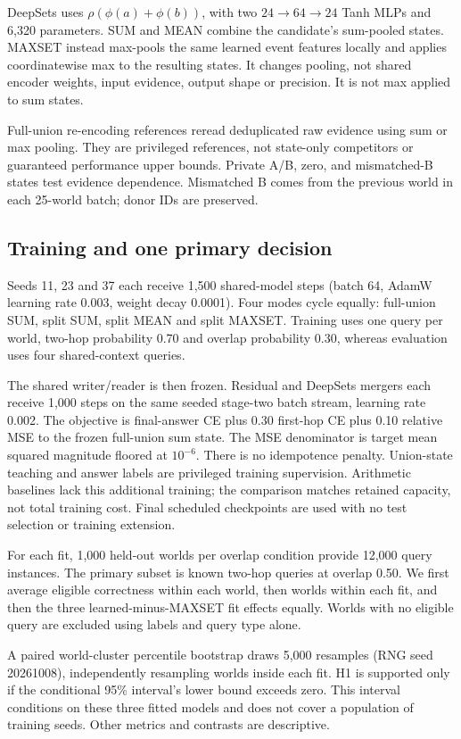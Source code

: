 \documentclass[10pt]{article}
\begin{document}
DeepSets uses $\rho(\phi(a)+\phi(b))$, with two
$24\rightarrow64\rightarrow24$ Tanh MLPs and 6,320 parameters.
SUM and MEAN combine the candidate's sum-pooled states. MAXSET instead
max-pools the same learned event features locally and applies coordinatewise
max to the resulting states. It changes pooling, not shared encoder weights,
input evidence, output shape or precision. It is not max applied to sum states.

Full-union re-encoding references reread deduplicated raw evidence using sum
or max pooling. They are privileged references, not state-only competitors
or guaranteed performance upper bounds. Private A/B, zero, and mismatched-B
states test evidence dependence. Mismatched B comes from the previous world
in each 25-world batch; donor IDs are preserved.

\subsection{Training and one primary decision}
Seeds 11, 23 and 37 each receive 1,500 shared-model steps (batch 64, AdamW
learning rate 0.003, weight decay 0.0001). Four modes cycle equally:
full-union SUM, split SUM, split MEAN and split MAXSET. Training uses one query
per world, two-hop probability 0.70 and overlap probability 0.30, whereas
evaluation uses four shared-context queries.

The shared writer/reader is then frozen. Residual and DeepSets mergers each
receive 1,000 steps on the same seeded stage-two batch stream, learning rate
0.002. The objective is final-answer CE plus 0.30 first-hop CE plus 0.10
relative MSE to the frozen full-union sum state. The MSE denominator is target
mean squared magnitude floored at $10^{-6}$. There is no idempotence penalty.
Union-state teaching and answer labels are privileged training supervision.
Arithmetic baselines lack this additional training; the comparison matches
retained capacity, not total training cost. Final scheduled checkpoints are
used with no test selection or training extension.

For each fit, 1,000 held-out worlds per overlap condition provide 12,000 query
instances. The primary subset is known two-hop queries at overlap 0.50.
We first average eligible correctness within each world, then worlds within
each fit, and then the three learned-minus-MAXSET fit effects equally. Worlds
with no eligible query are excluded using labels and query type alone.

A paired world-cluster percentile bootstrap draws 5,000 resamples (RNG seed
20261008), independently resampling worlds inside each fit. H1 is supported
only if the conditional 95\% interval's lower bound exceeds zero. This interval
conditions on these three fitted models and does not cover a population of
training seeds. Other metrics and contrasts are descriptive.
\end{document}
